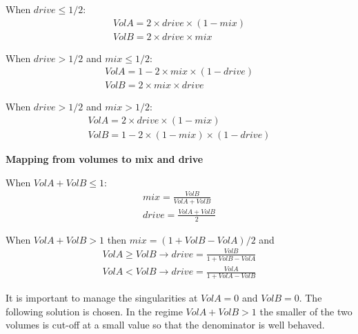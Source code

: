 \documentclass[portrait, 11pt, oneside]{report}
\begin{document}
When $drive\leq 1/2$:
\begin{eqnarray}
VolA=2\times drive \times (1-mix) \\
VolB=2\times drive \times mix 
\end{eqnarray}

When $drive> 1/2$ and $mix \leq 1/2$:
\begin{eqnarray}
VolA=1-2\times mix \times (1-drive) \\
VolB=2\times mix \times drive 
\end{eqnarray}

When $drive> 1/2$ and $mix > 1/2$:
\begin{eqnarray}
VolA=2\times drive \times (1-mix) \\
VolB=1-2\times (1-mix) \times (1-drive) 
\end{eqnarray}

\textbf{Mapping from volumes to mix and drive} 

When $VolA+VolB\leq 1$:
\begin{eqnarray}
  mix=\frac{VolB}{VolA+VolB} \\
  drive=\frac{VolA+VolB}{2} 
\end{eqnarray}

When $VolA+VolB>1$ then $mix = (1+VolB-VolA)/2$ and
\begin{eqnarray}
  VolA \geq VolB \to drive=\frac{VolB}{1+VolB-VolA} \\
  VolA < VolB \to drive=\frac{VolA}{1+VolA-VolB}
\end{eqnarray}

It is important to manage the singularities at $VolA=0$ and $VolB=0$. The following solution is chosen. In the regime $VolA+VolB>1$ the smaller of the two volumes is cut-off at a small value so that the denominator is well behaved.
\end{document}
